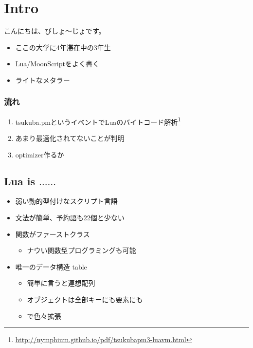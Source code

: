 \section{Intro}
\begin{frame}
	\frametitlesec
	こんにちは、びしょ〜じょです。
	\begin{itemize}
		\item ここの大学に4年滞在中の3年生
		\item {\alert{Lua/MoonScript}をよく書く}
		\item ライトなメタラー
	\end{itemize}
\end{frame}
\begin{frame}
	\frametitle{流れ}
	\begin{enumerate}
		\item tsukuba.pmというイベントでLuaのバイトコード解析\footnote{\url{http://nymphium.github.io/pdf/tsukubapm3-luavm.html}}
		\item あまり最適化されてないことが判明
		\item \alert{optimizer作るか}
	\end{enumerate}
\end{frame}
\subsection{Lua is $\dots\dots$}
\begin{frame}
	\frametitlesubs
	\begin{itemize}
		\item 弱い動的型付けなスクリプト言語
		\item 文法が簡単、予約語も22個と少ない
		\pause
		\item 関数がファーストクラス
			\begin{itemize}
				\item ナウい関数型プログラミングも可能
			\end{itemize}
		\pause
		\item \alert{唯一}のデータ構造 table
			\begin{itemize}
				\item 簡単に言うと\alert{連想配列}
				\item オブジェクトは全部キーにも要素にも
				\item {}で色々拡張
			\end{itemize}
	\end{itemize}
\end{frame}
